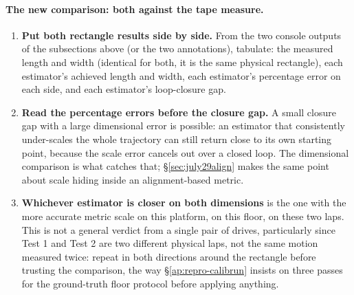 \paragraph{The new comparison: both against the tape measure.}
\begin{enumerate}[leftmargin=1.4em]
\item \textbf{Put both rectangle results side by side.} From the two
  console outputs of the subsections above (or the two 
  annotations), tabulate: the measured length and width (identical for
  both, it is the same physical rectangle), each estimator's achieved
  length and width, each estimator's percentage error on each side, and
  each estimator's loop-closure gap.
\item \textbf{Read the percentage errors before the closure gap.} A small
  closure gap with a large dimensional error is possible: an estimator
  that consistently under-scales the whole trajectory can still return
  close to its own starting point, because the scale error cancels out
  over a closed loop. The dimensional comparison is what catches that;
  \S\ref{sec:july29align} makes the same point about scale hiding inside
  an alignment-based metric.
\item \textbf{Whichever estimator is closer on both dimensions} is the one
  with the more accurate metric scale on this platform, on this floor, on
  these two laps. This is not a general verdict from a single pair of
  drives, particularly since Test 1 and Test 2 are two different physical
  laps, not the same motion measured twice: repeat in both directions
  around the rectangle before trusting the comparison, the way
  \S\ref{ap:repro-calibrun} insists on three passes for the ground-truth
  floor protocol before applying anything.
\end{enumerate}
